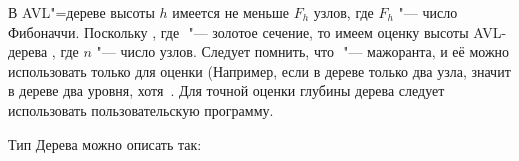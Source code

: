 В AVL"=дереве высоты $h$ имеется не меньше $F_h$ узлов, где $F_h$ "--- число Фибоначчи.
Поскольку $ $, где $ $ "--- золотое сечение, то имеем оценку высоты AVL-дерева $ $, где $n$ "--- число узлов.
Следует помнить, что $ $ "--- мажоранта, и её можно использовать только для оценки (Например, если в дереве только два узла, значит в дереве два уровня,
хотя $ $. Для точной оценки глубины дерева следует использовать пользовательскую программу.


Тип Дерева можно описать так:

